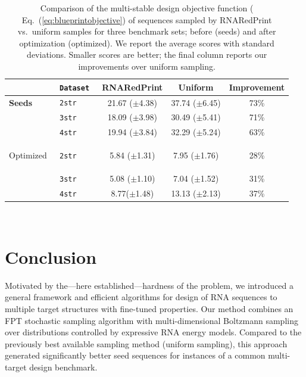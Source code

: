 \documentclass{bioinfo}
\newcommand{\Software}[1]{{\ttfamily #1}}
\newcommand{\ourprog}{\Software{RNARedPrint}}
\begin{document}
\begin{table}[t]
\centering
\medskip
\begin{tabular}{@{}>{\bf}l@{\quad}>{\tt}l@{\quad}@{\quad}c@{\quad}c@{\quad}c@{}}
             &   \textbf{\textrm{Dataset}}   & {\bfseries\ourprog{}} & \textbf{Uniform} & \textbf{Improvement} \\\toprule
  Seeds      & 2str & 21.67 ($\pm$4.38) & 37.74 ($\pm$6.45) & 73\%\\
             & 3str & 18.09 ($\pm$3.98) & 30.49 ($\pm$5.41) & 71\%\\
             & 4str & 19.94 ($\pm$3.84) & 32.29 ($\pm$5.24) & 63\%\\\midrule

  Optimized  & 2str & 5.84 ($\pm$1.31) & 7.95 ($\pm$1.76) & 28\%\\
             & 3str & 5.08 ($\pm$1.10) & 7.04 ($\pm$1.52) & 31\%\\
             & 4str & 8.77($\pm$1.48) & 13.13 ($\pm$2.13) & 37\% \\ \bottomrule
\end{tabular}\\[1em]

\caption{Comparison of the multi-stable design objective function (
  Eq.~(\ref{eq:blueprintobjective}) of sequences sampled by \ourprog{}
  vs.\ uniform samples for three benchmark sets; before (seeds) and
  after optimization (optimized). We report the average scores with
  standard deviations. Smaller scores are better; the final column
  reports our improvements over uniform sampling.}
\label{tab:benchmark-results}

\vspace{-12pt}
\end{table}

\section{Conclusion}
Motivated by the---here established---hardness of the problem, we introduced a general framework and efficient algorithms for design of RNA sequences to multiple target structures with fine-tuned properties. Our method combines an FPT stochastic sampling algorithm with multi-dimensional Boltzmann sampling over distributions controlled by expressive RNA energy models.
Compared to the previously best available sampling method (uniform sampling), this approach generated significantly better seed sequences for instances of a common multi-target design benchmark.
\end{document}
